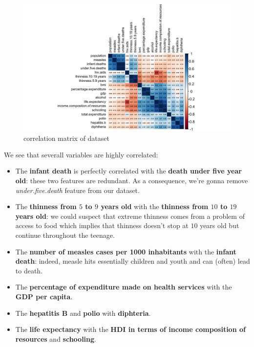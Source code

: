 \begin{figure}[H]
	\centering
	\includegraphics{figures/eda/correlation_matrix.png}
	\caption{correlation matrix of dataset}
	\label{fig:correlation_matrix}
\end{figure}

We see that severall variables are highly correlated:
\begin{itemize}
	\item The \textbf{infant death} is perfectly correlated with the \textbf{death under five year old}: these two features are redundant. As a consequence, we're gonna remove \textit{under.five.death} feature from our dataset.
	\item The \textbf{thinness from $5$ to $9$ years old} with the \textbf{thinness from $10$ to $19$ years old}: we could suspect that extreme thinness comes from a problem of access to food which implies that thinness doesn't stop at $10$ years old but continue throughout the teenage.
	\item The \textbf{number of measles cases per 1000 inhabitants} with the \textbf{infant death}: indeed, measle hits essentially children and youth and can (often) lead to death.
	\item The \textbf{percentage of expenditure made on health services} with the \textbf{GDP per capita}.
	\item The \textbf{hepatitis B} and \textbf{polio} with \textbf{diphteria}.
	\item The \textbf{life expectancy} with the \textbf{HDI in terms of income composition of resources} and \textbf{schooling}.
\end{itemize}